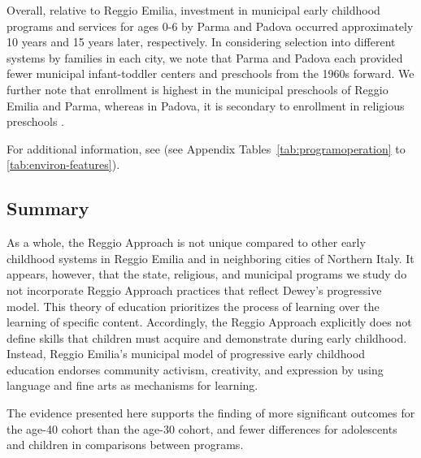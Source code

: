 Overall, relative to Reggio Emilia, investment in municipal early childhood programs and services for ages 0-6 by Parma and Padova occurred approximately 10 years and 15 years later, respectively. In considering selection into different systems by families in each city, we note that Parma and Padova each provided fewer municipal infant-toddler centers and preschools from the 1960s forward. We further note that enrollment is highest in the municipal preschools of Reggio Emilia and Parma, whereas in Padova, it is secondary to enrollment in religious preschools \citep{Padova-Admin-Data_1964-2011,Reggio-Admin-data_1966-2006,Reggio-Annual-Journals_1994-2011}. 

For additional information, see (see Appendix Tables~\ref{tab:programoperation} to \ref{tab:environ-features}). 

\subsection{Summary}

As a whole, the Reggio Approach is not unique compared to other early childhood systems in Reggio Emilia and in neighboring cities of Northern Italy. It appears, however, that the state, religious, and municipal programs we study do not incorporate Reggio Approach practices that reflect Dewey's progressive model. This theory of education prioritizes the process of learning over the learning of specific content. Accordingly, the Reggio Approach explicitly does not define skills that children must acquire and demonstrate during early childhood. Instead, Reggio Emilia's municipal model of progressive early childhood education endorses community activism, creativity, and expression by using language and fine arts as mechanisms for learning. 

The evidence presented here supports the finding of more significant outcomes for the age-40 cohort than the age-30 cohort, and fewer differences for adolescents and children in comparisons between programs. 
